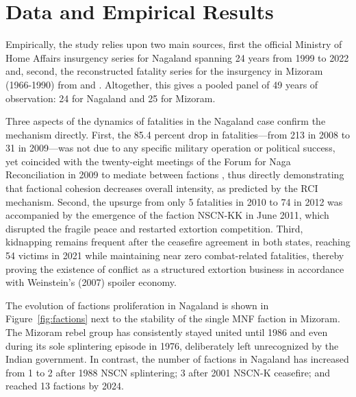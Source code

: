 \documentclass[12pt,a4paper]{article}
\begin{document}
\section{Data and Empirical Results}
Empirically, the study relies upon two main sources, first the official Ministry of Home Affairs insurgency series for Nagaland spanning 24 years from 1999 to 2022 and, second, the reconstructed fatality series for the insurgency in Mizoram (1966-1990) from \citet{bhaumik2009} and \citet{choudhury1999}. Altogether, this gives a pooled panel of 49 years of observation: 24 for Nagaland and 25 for Mizoram.

Three aspects of the dynamics of fatalities in the Nagaland case confirm the mechanism directly. First, the 85.4 percent drop in fatalities—from 213 in 2008 to 31 in 2009—was not due to any specific military operation or political success, yet coincided with the twenty-eight meetings of the Forum for Naga Reconciliation in 2009 to mediate between factions \citep{idsa2009}, thus directly demonstrating that factional cohesion decreases overall intensity, as predicted by the RCI mechanism. Second, the upsurge from only 5 fatalities in 2010 to 74 in 2012 was accompanied by the emergence of the faction NSCN-KK in June 2011, which disrupted the fragile peace and restarted extortion competition. Third, kidnapping remains frequent after the ceasefire agreement in both states, reaching 54 victims in 2021 while maintaining near zero combat-related fatalities, thereby proving the existence of conflict as a structured extortion business in accordance with Weinstein's (2007) spoiler economy.

The evolution of factions proliferation in Nagaland is shown in Figure~\ref{fig:factions} next to the stability of the single MNF faction in Mizoram. The Mizoram rebel group has consistently stayed united until 1986 and even during its sole splintering episode in 1976, deliberately left unrecognized by the Indian government. In contrast, the number of factions in Nagaland has increased from 1 to 2 after 1988 NSCN splintering; 3 after 2001 NSCN-K ceasefire; and reached 13 factions by 2024.
\end{document}
